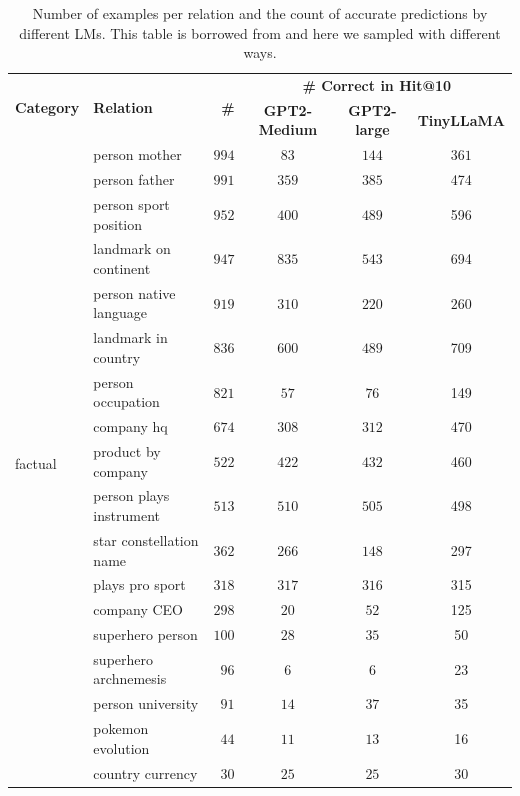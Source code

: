 \begin{table}[h!]
\vspace{-5pt}
\small
    \centering
    \footnotesize
    \caption{\small Number of examples per relation and the count of accurate predictions by different LMs. This table is borrowed from \citet{hernandez2024linearity} and here we sampled with different ways. 
    }
    \begin{tabular}{l|l r | c c c}
        \toprule
         \multirow{2}{2em}{\textbf{Category}} & \multirow{2}{3.5em}{\textbf{Relation}}& \multirow{2}{1em}{\textbf{\#}} & \multicolumn{3}{c}{\textbf{\# Correct in Hit@10}}\\
       & & &  \textbf{GPT2-Medium} & \textbf{GPT2-large} & \textbf{TinyLLaMA}\\
        \midrule
         \multirow{26}{*}{factual}
& person mother             & $994$ & $83$ & $144$ & $361$ \\ 
& person father             & $991$ & $359$ & $385$ & 474 \\ 
& person sport position     & $952$ & $400$ & $489$ &  596 \\ 
& landmark on continent     & $947$ & $835$ & $543$ &  694 \\ 
& person native language    & $919$ & $310$ & $220$ & $260$ \\ 
& landmark in country       & $836$ & $600$ & $489$ & 709\\ 
& person occupation         & $821$ & $57$  & $76$  &  149 \\ 
& company hq                & $674$ & $308$ & $312$ & 470 \\ 
& product by company        & $522$ & $422$ & $432$   & 460 \\ 
& person plays instrument   & $513$ & $510$ & $505$ & 498 \\ 
& star constellation name   & $362$ & $266$ & $148$ & 297 \\ 
& plays pro sport           & $318$ & $317$ & $316$ & 315 \\ 
& company CEO               & $298$ & $20$  & $52$  & 125 \\ 
& superhero person          & $100$ & $28$  & $35$   & 50 \\ 
& superhero archnemesis     & $96$  & $6$   & $6$  & 23 \\ 
& person university         & $91$  & $14$  & $37$  & 35 \\ 
& pokemon evolution         & $44$  & $11$  & $13$  & 16\\ 
& country currency          & $30$  & $25$  & $25$  & $30$\\ 

\end{tabular}
\end{table}
